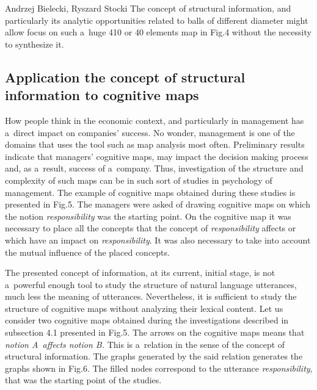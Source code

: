 \begin{artengenv2auth}{Andrzej Bielecki, Ryszard Stocki}
The concept of structural information, and particularly its analytic opportunities related to balls of different diameter might allow focus on such a~huge 410 
\parencite[][]{iasiello_whats_2023} %
 or 40 elements map in Fig.4 without the necessity to synthesize it.



\subsection{Application the concept of structural information to cognitive maps}



How people think in the economic context, and particularly in management has a~direct impact on companies' success. No wonder, management is one of the domains that uses the tool such as map analysis most often. Preliminary results indicate that managers' cognitive maps, may impact the decision making process and, as a~result, success of a~company. Thus, investigation of the structure and complexity of such maps can be in such sort of studies in psychology of management. The example of cognitive maps obtained during these studies is presented in Fig.5. The managers were asked of drawing cognitive maps on which the notion \textit{responsibility} was the starting point. On the cognitive map it was necessary to place all the concepts that the concept of \textit{responsibility} affects or which have an impact on \textit{responsibility}. It was also necessary to take into account the mutual influence of the placed concepts.



The presented concept of information, at its current, initial stage, is not a~powerful enough tool to study the structure of natural language utterances, much less the meaning of utterances. Nevertheless, it is sufficient to study the structure of cognitive maps without analyzing their lexical content. Let us consider two cognitive maps obtained during the investigations described in subsection 4.1 presented in Fig.5. The arrows on the cognitive maps means that \textit{notion A~affects notion B.} This is a~relation in the sense of the concept of structural information. The graphs generated by the said relation generates the graphs shown in Fig.6. The filled nodes correspond to the utterance \textit{responsibility}, that was the starting point of the studies.

\begin{figure}[htbp]
\begin{adjustwidth}{-.1\textwidth}{}
  \begin{minipage}{.5\linewidth}
    \centering
  \begin{tikzpicture}[scale=0.6, transform shape,
   centernode/.style={ellipse, align=center, minimum width=2cm},
        mynode/.style={draw, align=center, rounded corners, minimum width=1cm, minimum height=0.5cm},
        myarrow/.style={<-, >=latex, thick},
        node distance=1cm and 2cm
    ]
    

\end{tikzpicture}
\end{minipage}
\end{adjustwidth}
\end{figure}
\end{artengenv2auth}

